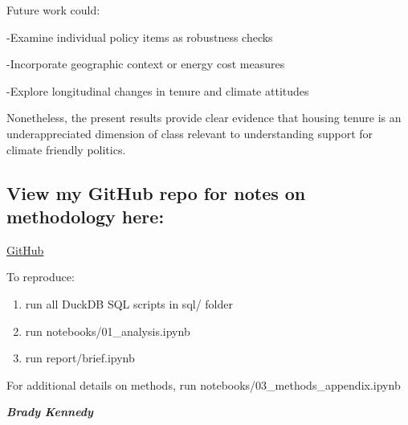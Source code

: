 \documentclass[
  letterpaper,
  DIV=11,
  numbers=noendperiod]{scrartcl}
\begin{document}
Future work could:

-Examine individual policy items as robustness checks

-Incorporate geographic context or energy cost measures

-Explore longitudinal changes in tenure and climate attitudes

Nonetheless, the present results provide clear evidence that housing
tenure is an underappreciated dimension of class relevant to
understanding support for climate friendly politics.

\subsection{View my GitHub repo for notes on methodology
here:}\label{view-my-github-repo-for-notes-on-methodology-here}

\href{https://github.com/bmdknndy/HomeOwnershipClimatePolicySupport}{GitHub}

To reproduce:

\begin{enumerate}
\def\labelenumi{\arabic{enumi}.}
\item
  run all DuckDB SQL scripts in sql/ folder
\item
  run notebooks/01\_analysis.ipynb
\item
  run report/brief.ipynb
\end{enumerate}

For additional details on methods, run
notebooks/03\_methods\_appendix.ipynb

\textbf{\emph{Brady Kennedy}}
\end{document}
